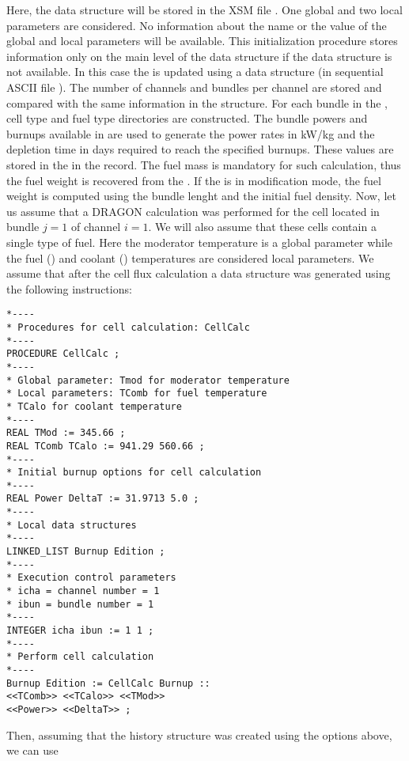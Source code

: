 Here, the  data structure will be stored in the XSM file . One global and two local parameters 
are considered. No information about the name or the value of the global and local parameters will be available. 
This initialization procedure stores information only on the main level of the  data structure if the  
data structure is not available. In this case the  is updated using a  data structure (in sequential ASCII 
file ). The number of channels and bundles per channel are stored and compared with the same information 
in the  structure. For each bundle in the , cell type and fuel type directories are constructed. The bundle 
powers and burnups available in  are used to generate the power rates in kW/kg and the depletion time in days 
required to reach the specified burnups. These values are stored in the  in the  record. 
The fuel mass is mandatory for such calculation, thus the fuel weight is recovered from the . If the  
is in modification mode, the fuel weight is computed using the bundle lenght and the initial fuel density. 
Now, let us assume that a DRAGON calculation was performed for the cell located in bundle $j=1$ of channel 
$i=1$. We will also assume that these cells contain a single type of fuel. Here the moderator temperature  is a 
global parameter while the fuel () and coolant () temperatures are considered local parameters. We 
assume that after the cell flux calculation a  data structure was generated using the following instructions: 

\begin{verbatim}
*---- 
* Procedures for cell calculation: CellCalc 
*---- 
PROCEDURE CellCalc ; 
*---- 
* Global parameter: Tmod for moderator temperature 
* Local parameters: TComb for fuel temperature 
* TCalo for coolant temperature 
*---- 
REAL TMod := 345.66 ; 
REAL TComb TCalo := 941.29 560.66 ; 
*---- 
* Initial burnup options for cell calculation 
*---- 
REAL Power DeltaT := 31.9713 5.0 ; 
*---- 
* Local data structures 
*---- 
LINKED_LIST Burnup Edition ; 
*---- 
* Execution control parameters 
* icha = channel number = 1 
* ibun = bundle number = 1 
*---- 
INTEGER icha ibun := 1 1 ; 
*---- 
* Perform cell calculation 
*---- 
Burnup Edition := CellCalc Burnup :: 
<<TComb>> <<TCalo>> <<TMod>> 
<<Power>> <<DeltaT>> ; 
\end{verbatim}

Then, assuming that the history structure  was created using the options above, we can use

